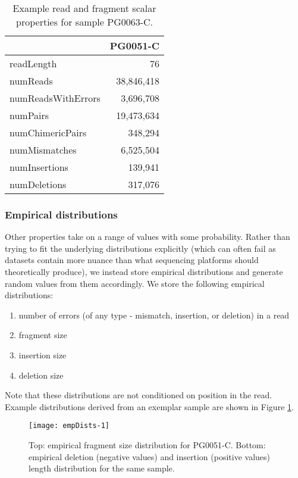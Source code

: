 \begin{table}[]
\centering
\caption{Example read and fragment scalar properties for sample PG0063-C.}
\label{tbl:scalarvalues}
\begin{tabular}{@{}lr@{}}
\toprule
                   & PG0051-C\\
\midrule
readLength         & 76\\
numReads           & 38,846,418\\
numReadsWithErrors & 3,696,708\\
numPairs           & 19,473,634\\
numChimericPairs   & 348,294\\
numMismatches      & 6,525,504\\
numInsertions      & 139,941\\
numDeletions       & 317,076\\
\bottomrule
\end{tabular}
\end{table}

\subsubsection{Empirical distributions}

Other properties take on a range of values with some probability.  Rather than trying to fit the underlying distributions explicitly (which can often fail as datasets contain more nuance than what sequencing platforms should theoretically produce), we instead store empirical distributions and generate random values from them accordingly.  We store the following empirical distributions:

\begin{enumerate}
    \item number of errors (of any type - mismatch, insertion, or deletion) in a read
    \item fragment size
    \item insertion size
    \item deletion size
\end{enumerate}

Note that these distributions are not conditioned on position in the read.  Example distributions derived from an exemplar sample are shown in Figure \ref{fig:empDists-1}.

\begin{figure}[h!]
  \centering
    \texttt{[image: empDists-1]}
  \caption{Top: empirical fragment size distribution for PG0051-C.  Bottom: empirical deletion (negative values) and insertion (positive values) length distribution for the same sample.}
  \label{fig:empDists-1}
\end{figure}

